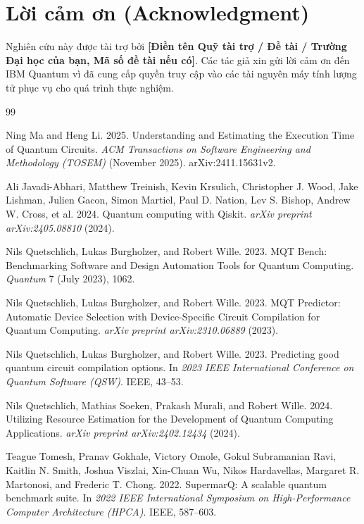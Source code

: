 \documentclass[11pt, a4paper]{article}
\begin{document}
\section*{Lời cảm ơn (Acknowledgment)}
Nghiên cứu này được tài trợ bởi \textbf{[Điền tên Quỹ tài trợ / Đề tài / Trường Đại học của bạn, Mã số đề tài nếu có]}. Các tác giả xin gửi lời cảm ơn đến IBM Quantum vì đã cung cấp quyền truy cập vào các tài nguyên máy tính lượng tử phục vụ cho quá trình thực nghiệm.

\begin{thebibliography}{99}

Ning Ma and Heng Li. 2025. Understanding and Estimating the Execution Time of Quantum Circuits. \textit{ACM Transactions on Software Engineering and Methodology (TOSEM)} (November 2025). arXiv:2411.15631v2.

Ali Javadi-Abhari, Matthew Treinish, Kevin Krsulich, Christopher J. Wood, Jake Lishman, Julien Gacon, Simon Martiel, Paul D. Nation, Lev S. Bishop, Andrew W. Cross, et al. 2024. Quantum computing with Qiskit. \textit{arXiv preprint arXiv:2405.08810} (2024).

Nils Quetschlich, Lukas Burgholzer, and Robert Wille. 2023. MQT Bench: Benchmarking Software and Design Automation Tools for Quantum Computing. \textit{Quantum} 7 (July 2023), 1062.

Nils Quetschlich, Lukas Burgholzer, and Robert Wille. 2023. MQT Predictor: Automatic Device Selection with Device-Specific Circuit Compilation for Quantum Computing. \textit{arXiv preprint arXiv:2310.06889} (2023).

Nils Quetschlich, Lukas Burgholzer, and Robert Wille. 2023. Predicting good quantum circuit compilation options. In \textit{2023 IEEE International Conference on Quantum Software (QSW)}. IEEE, 43--53.

Nils Quetschlich, Mathias Soeken, Prakash Murali, and Robert Wille. 2024. Utilizing Resource Estimation for the Development of Quantum Computing Applications. \textit{arXiv preprint arXiv:2402.12434} (2024).

Teague Tomesh, Pranav Gokhale, Victory Omole, Gokul Subramanian Ravi, Kaitlin N. Smith, Joshua Viszlai, Xin-Chuan Wu, Nikos Hardavellas, Margaret R. Martonosi, and Frederic T. Chong. 2022. SupermarQ: A scalable quantum benchmark suite. In \textit{2022 IEEE International Symposium on High-Performance Computer Architecture (HPCA)}. IEEE, 587--603.


\end{thebibliography}
\end{document}
